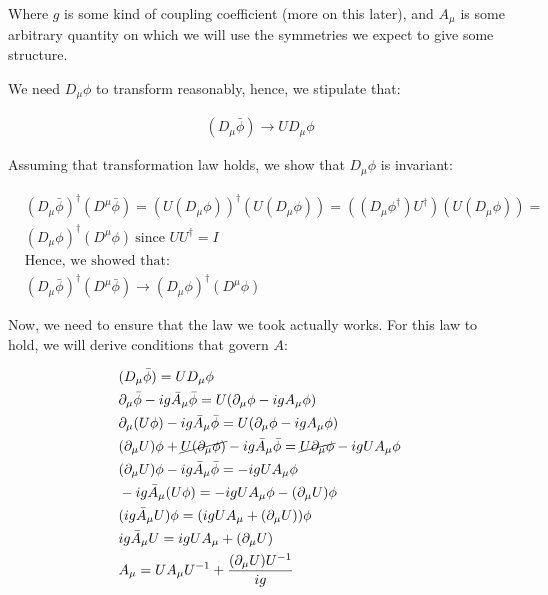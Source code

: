Where $g$ is some kind of coupling coefficient (more on this later), and $A_\mu$
is some arbitrary quantity on which we will use the symmetries we expect to
give some structure.

We need $D_\mu \phi$ to transform reasonably, hence, we stipulate that:

\begin{align*}
    (D_\mu \bar \phi) \to U D_\mu \phi
\end{align*}

Assuming that transformation law holds, we show that $D_\mu \phi$ is invariant:

\begin{align*}
    &(D_\mu \bar \phi)^\dagger (D^\mu \bar \phi) = (U (D_\mu \phi))^\dagger (U (D_\mu \phi)) = 
    ((D_\mu \phi^\dagger) U^\dagger) (U (D_\mu \phi)) = \\
    &(D_\mu \phi)^\dagger (D^\mu \phi)~\text{since $UU^\dagger = I$}
    \\
    &\text{Hence, we showed that:} \\
    &(D_\mu \bar \phi)^\dagger (D^\mu \bar \phi) \to  (D_\mu \phi)^\dagger (D^\mu \phi)
\end{align*}

Now, we need to ensure that the law we took actually works. For this law to
hold, we will derive conditions that govern $A$:

\begin{align*}
    &(D_\mu \bar \phi) = U D_\mu \phi \\
    &\partial_\mu \bar \phi - i g \bar A_\mu \bar \phi = U (\partial_\mu \phi  - i g A_\mu \phi) \\
    &\partial_\mu (U \phi) - i g \bar A_\mu \bar \phi = U (\partial_\mu \phi  - i g A_\mu \phi) \\
    &(\partial_\mu U) \phi + \cancel{U (\partial_\mu \phi)} - i g \bar A_\mu \bar \phi = \cancel{U \partial_\mu \phi}  - i g U A_\mu \phi \\
    &(\partial_\mu U) \phi  - i g \bar A_\mu \bar \phi =  - i g U A_\mu \phi \\
    &- i g \bar A_\mu (U \phi) =  - i g U A_\mu \phi - (\partial_\mu U) \phi  \\
    &(i g \bar A_\mu U) \phi =  (i g U A_\mu + (\partial_\mu U)) \phi  \\
    &i g \bar A_\mu U  =  i g U A_\mu + (\partial_\mu U)   \\
    &A_\mu  =   U A_\mu U^{-1} + \frac{(\partial_\mu U) U^{-1}}{i g}   \\
\end{align*}


